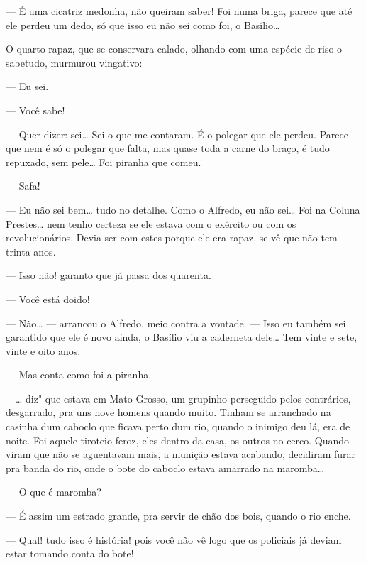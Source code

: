 \begin{linenumbers}
--- É uma cicatriz medonha, não queiram saber! Foi numa briga, parece
que até ele perdeu um dedo, só que isso eu não sei como foi, o
Basílio\ldots{}

O quarto rapaz, que se conservara calado, olhando com uma espécie de
riso o sabetudo, murmurou vingativo:

--- Eu sei.

--- Você sabe!

--- Quer dizer: sei\ldots{} Sei o que me contaram. É o polegar que ele
perdeu. Parece que nem é só o polegar que falta, mas quase toda a carne
do braço, é tudo repuxado, sem pele\ldots{} Foi piranha que comeu.

--- Safa!

--- Eu não sei bem\ldots{} tudo no detalhe. Como o Alfredo, eu não sei\ldots{} Foi
na Coluna Prestes\ldots{} nem tenho certeza se ele estava com o exército ou
com os revolucionários. Devia ser com estes porque ele era rapaz, se vê
que não tem trinta anos.

--- Isso não! garanto que já passa dos quarenta.

--- Você está doido!

--- Não\ldots{} --- arrancou o Alfredo, meio contra a vontade. --- Isso eu
também sei garantido que ele é novo ainda, o Basílio viu a caderneta
dele\ldots{} Tem vinte e sete, vinte e oito anos.

--- Mas conta como foi a piranha.

---\ldots{} diz"-que estava em Mato Grosso, um grupinho perseguido pelos
contrários, desgarrado, pra uns nove homens quando muito. Tinham se
arranchado na casinha dum caboclo que ficava perto dum rio, quando o
inimigo deu lá, era de noite. Foi aquele tiroteio feroz, eles dentro da
casa, os outros no cerco. Quando viram que não se aguentavam mais, a
munição estava acabando, decidiram furar pra banda do rio, onde o bote
do caboclo estava amarrado na maromba\ldots{}

--- O que é maromba?

--- É assim um estrado grande, pra servir de chão dos bois, quando o rio
enche.

--- Qual! tudo isso é história! pois você não vê logo que os policiais
já deviam estar tomando conta do bote!


\end{linenumbers}
